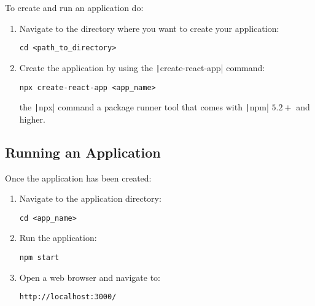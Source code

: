 To create and run an application do:
\begin{enumerate}
    \item Navigate to the directory where you want to create your application:
    \begin{verbatim}
cd <path_to_directory>
    \end{verbatim}
    \item Create the application by using the 
    \texttt|create-react-app| command:
    \begin{verbatim}
npx create-react-app <app_name>
    \end{verbatim}
    the \texttt|npx| command a package runner tool that comes with
    \texttt|npm| $5.2+$ and higher.
\end{enumerate}

\subsection{Running an Application}

Once the application has been created:
\begin{enumerate}
    \item Navigate to the application directory:
    \begin{verbatim}
cd <app_name>
    \end{verbatim}
    \item Run the application:
    \begin{verbatim}
npm start
    \end{verbatim}
    \item Open a web browser and navigate to:
    \begin{verbatim}
http://localhost:3000/
    \end{verbatim}
\end{enumerate}
